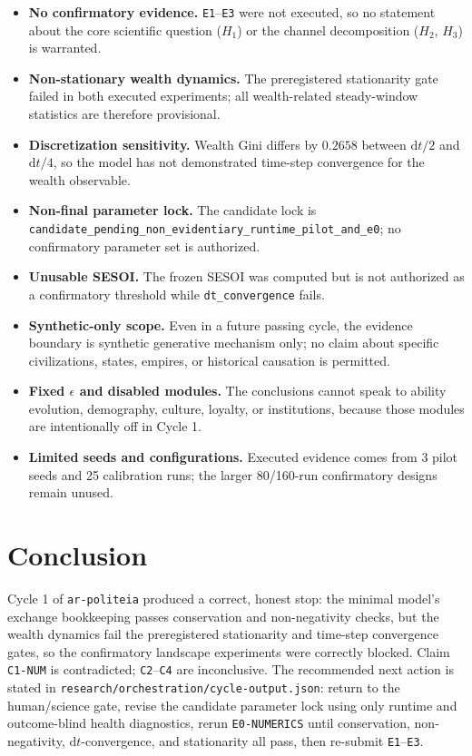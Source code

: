 \documentclass[11pt,a4paper]{article}
\newcommand{\code}[1]{\texttt{#1}}
\begin{document}
\begin{itemize}[leftmargin=1.9em]
\item \textbf{No confirmatory evidence.} \code{E1}--\code{E3} were not executed,
so no statement about the core scientific question ($H_1$) or the channel
decomposition ($H_2$, $H_3$) is warranted.
\item \textbf{Non-stationary wealth dynamics.} The preregistered stationarity
gate failed in both executed experiments; all wealth-related steady-window
statistics are therefore provisional.
\item \textbf{Discretization sensitivity.} Wealth Gini differs by $0.2658$
between $\mathrm{d}t/2$ and $\mathrm{d}t/4$, so the model has not demonstrated
time-step convergence for the wealth observable.
\item \textbf{Non-final parameter lock.} The candidate lock is
\code{candidate\_pending\_non\_evidentiary\_runtime\_pilot\_and\_e0}; no
confirmatory parameter set is authorized.
\item \textbf{Unusable SESOI.} The frozen SESOI was computed but is not
authorized as a confirmatory threshold while \code{dt\_convergence} fails.
\item \textbf{Synthetic-only scope.} Even in a future passing cycle, the
evidence boundary is synthetic generative mechanism only; no claim about
specific civilizations, states, empires, or historical causation is permitted.
\item \textbf{Fixed $\epsilon$ and disabled modules.} The conclusions cannot
speak to ability evolution, demography, culture, loyalty, or institutions,
because those modules are intentionally off in Cycle 1.
\item \textbf{Limited seeds and configurations.} Executed evidence comes from
3 pilot seeds and 25 calibration runs; the larger 80/160-run confirmatory
designs remain unused.
\end{itemize}

\section{Conclusion}
\label{sec:conclusion}

Cycle 1 of \code{ar-politeia} produced a correct, honest stop: the minimal
model's exchange bookkeeping passes conservation and non-negativity checks, but
the wealth dynamics fail the preregistered stationarity and time-step
convergence gates, so the confirmatory landscape experiments were correctly
blocked. Claim \code{C1-NUM} is contradicted; \code{C2}--\code{C4} are
inconclusive. The recommended next action is stated in
\code{research/orchestration/cycle-output.json}: return to the human/science
gate, revise the candidate parameter lock using only runtime and outcome-blind
health diagnostics, rerun \code{E0-NUMERICS} until conservation,
non-negativity, $\mathrm{d}t$-convergence, and stationarity all pass, then
re-submit \code{E1}--\code{E3}.
\end{document}
